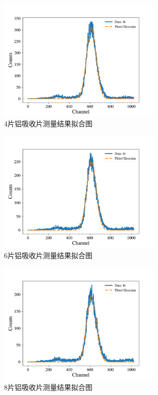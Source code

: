 \documentclass{article}
\begin{document}
    \begin{figure}[htbp]
        \centering
        \includegraphics[width=0.7\textwidth]{../plot/Fitted_4t.pdf}
        \caption{4片铝吸收片测量结果拟合图\label{fig:Fitted_4t}}
    \end{figure}
    \begin{figure}[htbp]
        \centering
        \includegraphics[width=0.7\textwidth]{../plot/Fitted_6t.pdf}
        \caption{6片铝吸收片测量结果拟合图\label{fig:Fitted_6t}}
    \end{figure}
    \begin{figure}[htbp]
        \centering
        \includegraphics[width=0.7\textwidth]{../plot/Fitted_8t.pdf}
        \caption{8片铝吸收片测量结果拟合图\label{fig:Fitted_8t}}
    \end{figure}
\end{document}
